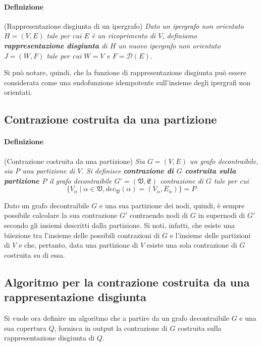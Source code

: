 \paragraph{Definizione} (Rappresentazione disgiunta di un ipergrafo) \newline
\textit{Dato un ipergrafo non orientato $H = (V, E)$ tale per cui $E$ \`e un ricoprimento di $V$,
definiamo \textbf{rappresentazione disgiunta} di $H$ un nuovo ipergrafo non orientato $J = (W, F)$
    tale per cui $W = V$ e $F = \mathcal{D}(E)$}. \newline

Si pu\`o notare, quindi, che la funzione di rappresentazione disgiunta pu\`o essere considerata come una
endofunzione idempotente sull'insieme degli ipergrafi non orientati.

\subsection{Contrazione costruita da una partizione}\label{subsec:Contrazione-costruita-da-una-partizione}

\paragraph{Definizione} (Contrazione costruita da una partizione) \newline
\textit{Sia $G = (V, E)$ un grafo decontraibile, sia $P$ una partizione di $V$.
Si definisce \textbf{contrazione di $G$ costruita sulla partizione $P$} il grafo decontraibile
    $G' = (\mathfrak{V}, \mathfrak{E})$ contrazione di $G$ tale per cui
    \begin{equation*}
        \{V_\alpha \mid \alpha \in \mathfrak{V}, dec_\mathfrak{V}(\alpha) = (V_\alpha, E_\alpha)\} = P
    \end{equation*}}

Dato un grafo decontraibile $G$ e una sua partizione dei nodi, quindi, \`e sempre possibile calcolare la sua
contrazione $G'$ contraendo nodi di $G$ in supernodi di $G'$ secondo gli insiemi descritti dalla partizione.
Si noti, infatti, che esiste una biiezione tra l'insieme delle possibili contrazioni di $G$ e l'insieme delle
partizioni di $V$ e che, pertanto, data una partizione di $V$ esiste una sola contrazione di $G$ costruita su di essa.

\subsection{Algoritmo per la contrazione costruita da una rappresentazione disgiunta}
Si vuole ora definire un algoritmo che a partire da un grafo decontraibile $G$ e una sua copertura $Q$,
fornisca in output la contrazione di $G$ costruita sulla rappresentazione disgiunta di $Q$.

